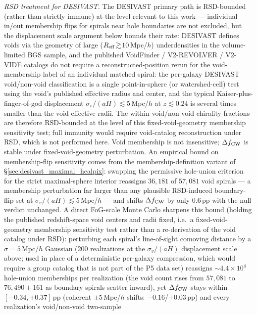 \documentclass[aps,prd,twocolumn,superscriptaddress,showpacs,preprintnumbers,nofootinbib,longbibliography,floatfix]{revtex4-2}
\begin{document}
\emph{RSD treatment for DESIVAST.} The DESIVAST primary
path is RSD-bounded (rather than strictly immune) at the level
relevant to this work --- individual in/out membership flips for
spirals near hole boundaries are not excluded, but the displacement
scale argument below bounds their rate: DESIVAST defines voids via the geometry of large
($R_{\rm eff}\!\gtrsim\!10$\,Mpc/$h$) underdensities in the
volume-limited BGS sample, and the published VoidFinder /
V2-REVOLVER / V2-VIDE catalogs do not require a
reconstructed-position rerun for the void-membership label of an
individual matched spiral: the per-galaxy DESIVAST void/non-void
classification is a single point-in-sphere (or watershed-cell)
test using the void's published effective radius and center, and
the typical Kaiser-plus-finger-of-god displacement $\sigma_v/(aH)
\lesssim 5$\,Mpc/$h$ at $z \lesssim 0.24$ is several times smaller
than the void effective radii. The within-void/non-void chirality
fractions are therefore RSD-bounded at the level of this
fixed-void-geometry membership sensitivity test; full immunity would
require void-catalog reconstruction under RSD, which is not performed
here. Void membership is not insensitive; $\Delta f_{\rm CW}$ is stable
under fixed-void-geometry perturbation. An empirical bound on membership-flip sensitivity
comes from the membership-definition variant of
\S\ref{sec:desivast_maximal_healpix}: swapping the permissive
hole-union criterion for the strict maximal-sphere interior reassigns
$36{,}181$ of $57{,}081$ void spirals --- a membership perturbation
far larger than any plausible RSD-induced boundary-flip set at
$\sigma_v/(aH) \lesssim 5$\,Mpc/$h$ --- and shifts
$\Delta f_{\rm CW}$ by only $0.6$\,pp with the null verdict
unchanged. A direct FoG-scale Monte Carlo sharpens this bound
(holding the published redshift-space void centers and radii fixed,
i.e.\ a fixed-void-geometry membership sensitivity test rather than a
re-derivation of the void catalog under RSD):
perturbing each spiral's line-of-sight comoving distance by a
$\sigma\!=\!5$\,Mpc/$h$ Gaussian (200 realizations at the
$\sigma_v/(aH)$ displacement scale above; used in place of a
deterministic per-galaxy compression, which would require a group
catalog that is not part of the P5 data set) reassigns
$\sim\!4.4\times10^{4}$ hole-union memberships per realization (the
void count rises from $57{,}081$ to $76{,}490 \pm 161$ as boundary
spirals scatter inward), yet $\Delta f_{\rm CW}$ stays within
$[-0.34, +0.37]$\,pp (coherent $\pm 5$\,Mpc/$h$ shifts:
$-0.16$/$+0.03$\,pp) and every realization's void/non-void two-sample
\end{document}
